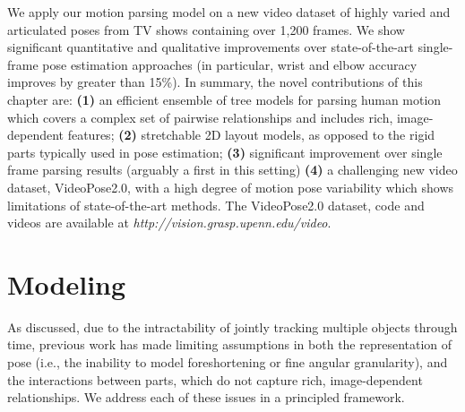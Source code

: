 
We apply our motion parsing model on a new video dataset of highly varied and 
articulated poses from TV shows containing over 1,200 frames.  We show 
significant quantitative and qualitative improvements over state-of-the-art 
single-frame pose estimation approaches (in particular, wrist and elbow 
accuracy improves by greater than 15\%).  In summary, the novel contributions 
of this chapter are: \textbf{(1)} an efficient ensemble of tree models for 
parsing human motion which covers a complex set of pairwise relationships and 
includes rich, image-dependent features; \textbf{(2)} stretchable 2D layout 
models, as opposed to the rigid parts typically used in pose estimation;
\textbf{(3)} significant improvement over single frame parsing results 
(arguably a first in this setting) \textbf{(4)} a challenging new video dataset, VideoPose2.0, 
with a high degree of motion pose variability which shows limitations of 
state-of-the-art methods.  The VideoPose2.0 dataset, code and videos are available at 
\textit{http://vision.grasp.upenn.edu/video}.



\section{Modeling}\label{sec:model}
As discussed, due to the intractability of jointly tracking multiple objects through time, previous 
work has made limiting assumptions in both the representation of pose (i.e., 
the inability to model foreshortening or fine angular granularity), and the 
interactions between parts, which do not capture rich, image-dependent 
relationships.  We address each of these issues in a principled framework.

